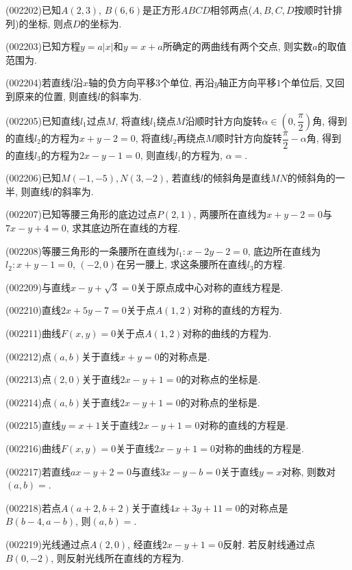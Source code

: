 \item (002202)已知$A(2,3)$, $B(6,6)$是正方形$ABCD$相邻两点($A,B,C,D$按顺时针排列)的坐标, 则点$D$的坐标为.
\item (002203)已知方程$y=a|x|$和$y=x+a$所确定的两曲线有两个交点, 则实数$a$的取值范围为.
\item (002204)若直线$l$沿$x$轴的负方向平移$3$个单位, 再沿$y$轴正方向平移$1$个单位后,
又回到原来的位置, 则直线$l$的斜率为.
\item (002205)已知直线$l_1$过点$M$, 将直线$l_1$绕点$M$沿顺时针方向旋转$\alpha\in(0,\dfrac{\pi}{2})$角, 得到的直线$l_2$的方程为$x+y-2=0$, 将直线$l_2$再绕点$M$顺时针方向旋转$\dfrac{\pi}{2}-\alpha$角, 得到的直线$l_3$的方程为$2x-y-1=0$, 则直线$l_1$的方程为, $\alpha=$.
\item (002206)已知$M(-1,-5),N(3,-2)$, 若直线$l$的倾斜角是直线$MN$的倾斜角的一半, 则直线$l$的斜率为.
\item (002207)已知等腰三角形的底边过点$P(2,1)$, 两腰所在直线为$x+y-2=0$与$7x-y+4=0$, 求其底边所在直线的方程.
\item (002208)等腰三角形的一条腰所在直线为${{l}_{1}}:x-2y-2=0$, 底边所在直线为${{l}_{2}}:x+y-1=0$, $(-2,0)$在另一腰上, 求这条腰所在直线${{l}_{3}}$的方程.
\item (002209)与直线$x-y+\sqrt{3}=0$关于原点成中心对称的直线方程是.
\item (002210)直线$2x+5y-7=0$关于点$A(1,2)$对称的直线的方程为.
\item (002211)曲线$F(x,y)=0$关于点$A(1,2)$对称的曲线的方程为.
\item (002212)点$(a,b)$关于直线$x+y=0$的对称点是.
\item (002213)点$(2,0)$关于直线$2x-y+1=0$的对称点的坐标是.
\item (002214)点$(a,b)$关于直线$2x-y+1=0$的对称点的坐标是.
\item (002215)直线$y=x+1$关于直线$2x-y+1=0$对称的直线的方程是.
\item (002216)曲线$F(x,y)=0$关于直线$2x-y+1=0$对称的曲线的方程是.
\item (002217)若直线$ax-y+2=0$与直线$3x-y-b=0$关于直线$y=x$对称, 则数对$(a,b)=$.
\item (002218)若点$A(a+2,b+2)$关于直线$4x+3y+11=0$的对称点是$B(b-4,a-b)$, 则$(a,b)=$.
\item (002219)光线通过点$A(2,0)$, 经直线$2x-y+1=0$反射. 若反射线通过点$B(0,-2)$, 则反射光线所在直线的方程为.
